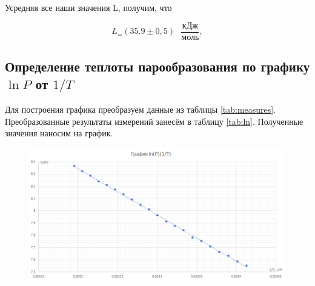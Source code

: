\documentclass[12pt,a4paper]{article}
\begin{document}
Усредняя все наши значения L, получим, что

\[ L_ = \left(35.9 \pm 0,5\right) \text{ } \frac{\text{кДж}}{\text{моль}}, \]

\subsection{Определение теплоты парообразования по графику $ \ln P $ от $ 1 / T $}

Для построения графика преобразуем данные из таблицы \ref{tab:measures}. Преобразованные результаты измерений занесём в таблицу \ref{tab:ln}. Полученные значения наносим на график.

\begin{figure}[H]
\begin{center}
		\includegraphics[width=15cm]{2.4.1_gr_2}
\end{center}
\end{figure}
\end{document}
